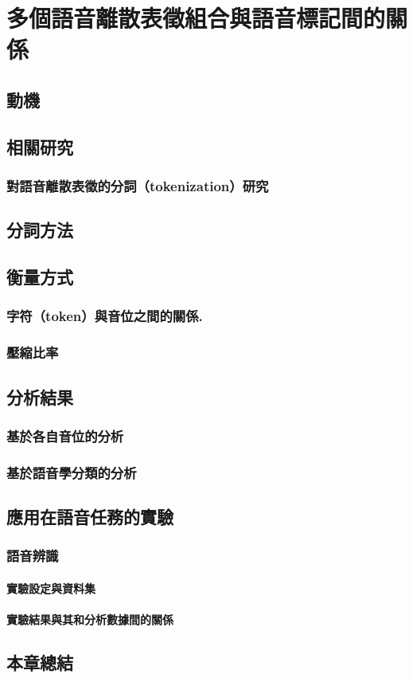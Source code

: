 \chapter{
    多個語音離散表徵組合與語音標記間的關係}



\section{動機}  %
\section{相關研究}
\subsection{對語音離散表徵的分詞（tokenization）研究}
\section{分詞方法}
\section{衡量方式}
\subsection{字符（token）與音位之間的關係.}
\subsection{壓縮比率}
\section{分析結果}
\subsection{基於各自音位的分析}
\subsection{基於語音學分類的分析}

\newpage

\section{應用在語音任務的實驗}
\subsection{語音辨識}
\subsubsection{實驗設定與資料集}
\subsubsection{實驗結果與其和分析數據間的關係}
\section{本章總結}
